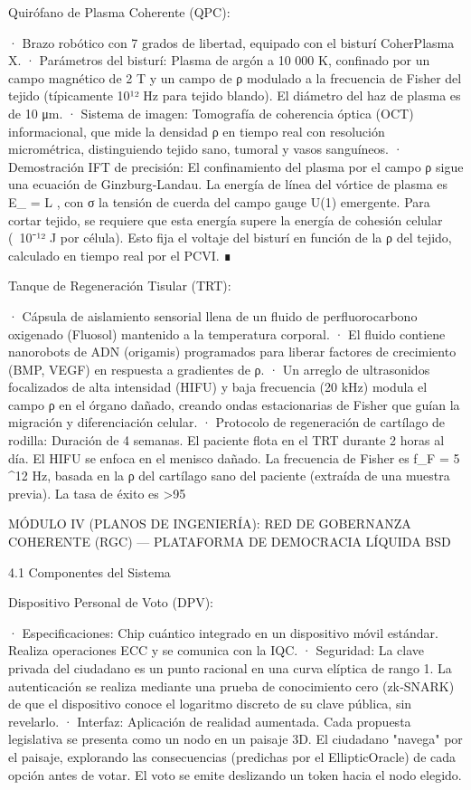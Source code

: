 \documentclass[12pt,a4paper]{book}
\begin{document}
Quirófano de Plasma Coherente (QPC):

· Brazo robótico con 7 grados de libertad, equipado con el bisturí CoherPlasma X.
· Parámetros del bisturí: Plasma de argón a 10 000 K, confinado por un campo magnético de 2 T y un campo de ρ modulado a la frecuencia de Fisher del tejido (típicamente 10¹² Hz para tejido blando). El diámetro del haz de plasma es de 10 μm.
· Sistema de imagen: Tomografía de coherencia óptica (OCT) informacional, que mide la densidad ρ en tiempo real con resolución micrométrica, distinguiendo tejido sano, tumoral y vasos sanguíneos.
· Demostración IFT de precisión: El confinamiento del plasma por el campo ρ sigue una ecuación de Ginzburg‑Landau. La energía de línea del vórtice de plasma es  E_{} = \sigma \cdot L , con σ la tensión de cuerda del campo gauge U(1) emergente. Para cortar tejido, se requiere que esta energía supere la energía de cohesión celular (~10⁻¹² J por célula). Esto fija el voltaje del bisturí en función de la ρ del tejido, calculado en tiempo real por el PCVI. ∎

Tanque de Regeneración Tisular (TRT):

· Cápsula de aislamiento sensorial llena de un fluido de perfluorocarbono oxigenado (Fluosol) mantenido a la temperatura corporal.
· El fluido contiene nanorobots de ADN (origamis) programados para liberar factores de crecimiento (BMP, VEGF) en respuesta a gradientes de ρ.
· Un arreglo de ultrasonidos focalizados de alta intensidad (HIFU) y baja frecuencia (20 kHz) modula el campo ρ en el órgano dañado, creando ondas estacionarias de Fisher que guían la migración y diferenciación celular.
· Protocolo de regeneración de cartílago de rodilla: Duración de 4 semanas. El paciente flota en el TRT durante 2 horas al día. El HIFU se enfoca en el menisco dañado. La frecuencia de Fisher es  f_F = 5 ^{12}  Hz, basada en la ρ del cartílago sano del paciente (extraída de una muestra previa). La tasa de éxito es >95%

MÓDULO IV (PLANOS DE INGENIERÍA): RED DE GOBERNANZA COHERENTE (RGC) — PLATAFORMA DE DEMOCRACIA LÍQUIDA BSD

4.1 Componentes del Sistema

Dispositivo Personal de Voto (DPV):

· Especificaciones: Chip cuántico integrado en un dispositivo móvil estándar. Realiza operaciones ECC y se comunica con la IQC.
· Seguridad: La clave privada del ciudadano es un punto racional en una curva elíptica de rango 1. La autenticación se realiza mediante una prueba de conocimiento cero (zk‑SNARK) de que el dispositivo conoce el logaritmo discreto de su clave pública, sin revelarlo.
· Interfaz: Aplicación de realidad aumentada. Cada propuesta legislativa se presenta como un nodo en un paisaje 3D. El ciudadano "navega" por el paisaje, explorando las consecuencias (predichas por el EllipticOracle) de cada opción antes de votar. El voto se emite deslizando un token hacia el nodo elegido.
\end{document}
